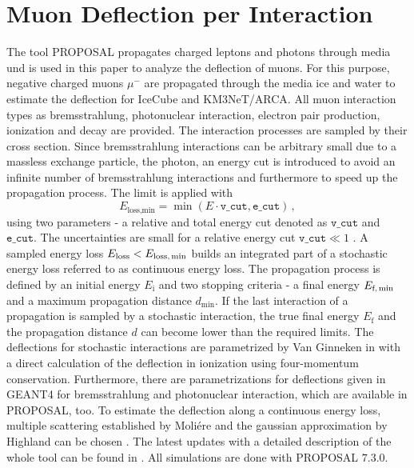 \section{Muon Deflection per Interaction}\label{sec:defl_per_int}
The tool PROPOSAL propagates charged leptons and photons through media und is 
used in this paper to analyze the deflection of muons. For this purpose, 
negative charged muons $\mu^-$ are propagated through the media ice and water 
to estimate the deflection for IceCube and KM3NeT/ARCA. All muon interaction types as bremsstrahlung, photonuclear interaction, electron pair production, 
ionization and decay are provided. The interaction processes are sampled by their cross section. Since bremsstrahlung interactions can be 
arbitrary small due to a massless exchange particle, the photon, an energy cut is introduced to avoid an infinite number of bremsstrahlung interactions 
and furthermore to speed up the propagation process. 
The limit is applied with 
\begin{equation}
    E_{\text{loss,min}} = \min{(E \cdot \texttt{v\_cut}, \texttt{e\_cut})}\,,
\end{equation}
using two parameters - a relative and total energy cut denoted as 
$\texttt{v\_cut}$ and $\texttt{e\_cut}$. The uncertainties are small 
for a relative energy cut $\texttt{v\_cut}\ll 1$ \cite{}.
A sampled energy loss 
$E_{\text{loss}} < E_{\text{loss,\,min}}$ builds an integrated part of a 
stochastic energy loss referred to as continuous energy loss. The 
propagation process is defined by an initial energy $E_{\text{i}}$ and 
two stopping criteria - a final energy $E_{\text{f,\,min}}$ and a 
maximum propagation distance $d_{\text{min}}$. If the last interaction of 
a propagation is sampled by a stochastic interaction, the true final energy 
$E_{\text{f}}$ and the 
propagation distance $d$ can become lower than the required limits. 
The deflections for stochastic interactions are parametrized by Van Ginneken 
in \cite{Van_Ginneken} with a direct calculation of the deflection in 
ionization using four-momentum conservation. 
Furthermore, there are parametrizations for deflections given in GEANT4 \cite{GEANT4_manual} for bremsstrahlung and photonuclear interaction, which 
are available in PROPOSAL, too.
To estimate the deflection along 
a continuous energy loss, multiple scattering established by Moliére 
\cite{moliere_scattering} and the gaussian approximation by Highland 
can be chosen \cite{highland_scattering}. 
The latest updates with a detailed description of the whole tool can be found 
in \cite{phd_soedingrekso}.
All simulations are done with PROPOSAL $7.3.0$.



